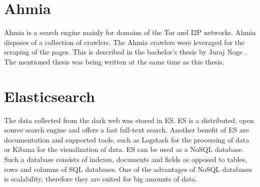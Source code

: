 \section{Ahmia} \label{ahmia}
Ahmia is a search engine mainly for domains of the Tor and I2P networks. Ahmia disposes of a collection of crawlers. The Ahmia crawlers were leveraged for the scraping of the pages. This is described in the bachelor's thesis by Juraj Noge \cite{bcScraping}. The mentioned thesis was being written at the same time as this thesis.

\section{Elasticsearch}  \label{Elasticsearch}
The data collected from the dark web was stored in ES. ES is a distributed, open source search engine \cite{elasticSearch} and offers a fast full-text search. Another benefit of ES are documentation and supported tools, such as Logstash \cite{logstash} for the processing of data or Kibana \cite{kibana} for the visualization of data. ES can be used as a NoSQL database. Such a database consists of indexes, documents and fields as opposed to tables, rows and columns of SQL databases.  One of the advantages of NoSQL databases is scalability, therefore they are suited for big amounts of data. 